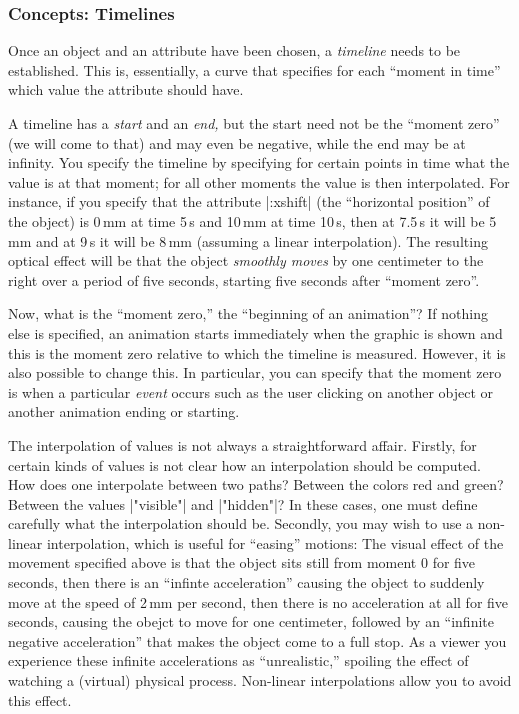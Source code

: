 \subsubsection{Concepts: Timelines}

Once an object and an attribute have been chosen, a \emph{timeline}
needs to be established. This is, essentially, a curve that specifies
for each ``moment in time'' which value the attribute should have.

A timeline has a \emph{start} and an \emph{end,} but the start need
not be the ``moment zero'' (we will come to that) and may even be
negative, while the end may be at infinity. You specify the timeline
by specifying for certain points in time what the value is at that
moment; for all other moments the value is then interpolated. For
instance, if you specify that the attribute |:xshift| (the
``horizontal position'' of the object) is 0\,mm at time 5\,s and 10\,mm
at time 10\,s, then at 7.5\,s it will be 5\,mm and at 9\,s it will
be 8\,mm (assuming a linear interpolation). The resulting optical
effect will be that the object \emph{smoothly moves} by one centimeter
to the right over a period of five seconds, starting five seconds
after ``moment zero''.

Now, what is the ``moment zero,'' the ``beginning of an animation''? If
nothing else is specified, an animation starts immediately when the
graphic is shown and this is the moment zero relative to which the
timeline is measured. However, it is also possible to change this. In
particular, you can specify that the moment zero is when a particular
\emph{event} occurs such as the user clicking on another object or
another animation ending or starting.

The interpolation of values is not always a straightforward affair.
Firstly, for certain kinds of values is not clear how an interpolation
should be computed. How does one interpolate between two paths?
Between the colors red and green? Between the values |"visible"| and
|"hidden"|? In these cases, one must define carefully what the
interpolation should be. Secondly, you may wish to use a non-linear
interpolation, which is useful for ``easing'' motions: The visual
effect of the movement 
specified above is that the object sits still from moment $0$ for five
seconds, then there is an ``infinte acceleration'' causing the object
to suddenly move at the speed of 2\,mm per second, then there is no
acceleration at all for five seconds, causing the obejct to move for
one centimeter, followed by an ``infinite negative acceleration'' that
makes the object come to a full stop. As a viewer you experience these
infinite accelerations as ``unrealistic,'' spoiling the effect of
watching a (virtual) physical process. Non-linear interpolations allow
you to avoid this effect. 


